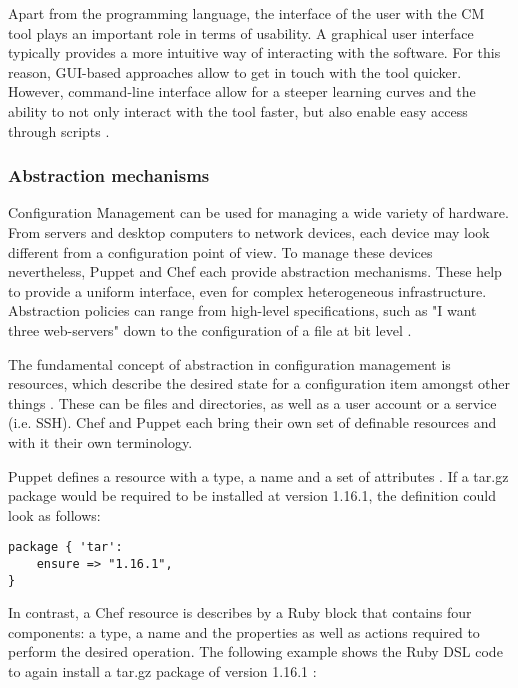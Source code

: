 Apart from the programming language, the interface of the user with the CM tool plays an important role in terms of usability. A graphical user interface typically provides a more intuitive way of interacting with the software. For this reason, GUI-based approaches allow to get in touch with the tool quicker. However, command-line interface allow for a steeper learning curves and the ability to not only interact with the tool faster, but also enable easy access through scripts \cite{delaet2010survey}.

\subsubsection{Abstraction mechanisms}

Configuration Management can be used for managing a wide variety of hardware. From servers and desktop computers to network devices, each device may look different from a configuration point of view. To manage these devices nevertheless, Puppet and Chef each provide abstraction mechanisms. These help to provide a uniform interface, even for complex heterogeneous infrastructure. Abstraction policies can range from high-level specifications, such as "I want three web-servers" down to the configuration of a file at bit level \cite{delaet2010survey}.

The fundamental concept of abstraction in configuration management is resources, which describe the desired state for a configuration item amongst other things \cite{chefioresource}. These can be files and directories, as well as a user account or a service (i.e. SSH). Chef and Puppet each bring their own set of definable resources and with it their own terminology.

Puppet defines a resource with a type, a name and a set of attributes \cite{pandey2012investigating}. If a tar.gz package would be required to be installed at version 1.16.1, the definition could look as follows:

\begin{verbatim}
package { 'tar':
	ensure => "1.16.1",
}
\end{verbatim}

In contrast, a Chef resource is describes by a Ruby block that contains four components: a type, a name and the properties as well as actions required to perform the desired operation. The following example  shows the Ruby DSL code to again install a tar.gz package of version 1.16.1 \cite{chefioresource}:\\


